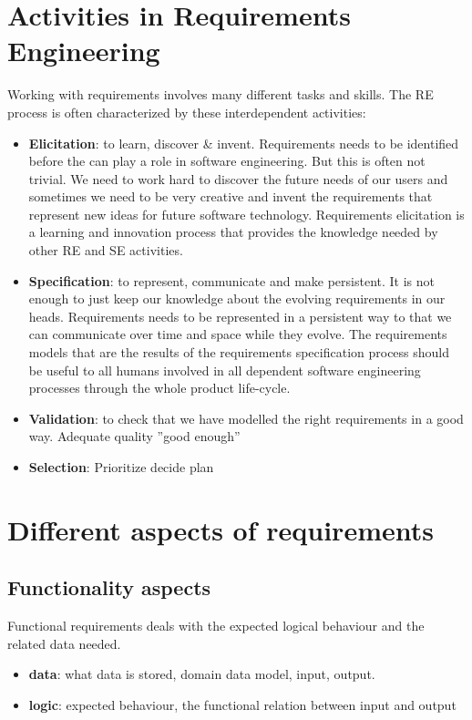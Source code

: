 \section*{Activities in Requirements Engineering}

Working with requirements involves many different tasks and skills. The RE process is often characterized by these interdependent activities: 

\begin{itemize}
  \item \textbf{Elicitation}: to learn, discover \& invent. Requirements needs to be identified before the can play a role in software engineering. But this is often not trivial. We need to work hard to discover the future needs of our users and sometimes we need to be very creative and invent the requirements that represent new ideas for future software technology. Requirements elicitation is a learning and innovation process that provides the knowledge needed by other RE and SE activities.
  \item \textbf{Specification}: to represent, communicate and make persistent. It is not enough to just keep our knowledge about the evolving requirements in our heads. Requirements needs to be represented in a persistent way to that we can communicate over time and space while they evolve. The requirements models that are the results of the requirements specification process should be useful to all humans involved in all dependent software engineering processes through the whole product life-cycle.
  \item \textbf{Validation}: to check that we have modelled the right requirements in a good way. Adequate quality ''good enough'' 
  \item \textbf{Selection}: Prioritize decide plan
\end{itemize}

\section*{Different aspects of requirements}

\subsection*{Functionality aspects}
Functional requirements deals with the expected logical behaviour and the related data needed.
\begin{itemize}
  \item \textbf{data}: what data is stored, domain data model, input, output.
  \item \textbf{logic}: expected behaviour, the functional relation between input and output
\end{itemize}

